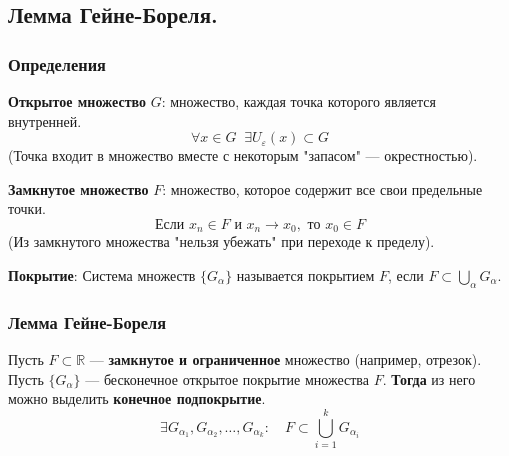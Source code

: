 \subsection{Лемма Гейне-Бореля.}

\subsubsection*{Определения}
\begin{tcolorbox}
    \textbf{Открытое множество} $G$: множество, каждая точка которого является внутренней.
    \[ \forall x \in G \;\; \exists U_\varepsilon(x) \subset G \]
    (Точка входит в множество вместе с некоторым "запасом" — окрестностью).
\end{tcolorbox}

\begin{tcolorbox}
    \textbf{Замкнутое множество} $F$: множество, которое содержит все свои предельные точки.
    \[ \text{Если } x_n \in F \text{ и } x_n \to x_0, \text{ то } x_0 \in F \]
    (Из замкнутого множества "нельзя убежать" при переходе к пределу).
\end{tcolorbox}

\begin{tcolorbox}
    \textbf{Покрытие}: Система множеств $\{G_\alpha\}$ называется покрытием $F$, если $F \subset \bigcup_\alpha G_\alpha$.
\end{tcolorbox}

\subsubsection*{Лемма Гейне-Бореля}
\begin{tcolorbox}
    Пусть $F \subset \mathbb{R}$ — \textbf{замкнутое и ограниченное} множество (например, отрезок).
    Пусть $\{G_\alpha\}$ — бесконечное открытое покрытие множества $F$.
    \textbf{Тогда} из него можно выделить \textbf{конечное подпокрытие}.
    \[ \exists G_{\alpha_1}, G_{\alpha_2}, \dots, G_{\alpha_k}: \quad F \subset \bigcup_{i=1}^k G_{\alpha_i} \]
\end{tcolorbox}

